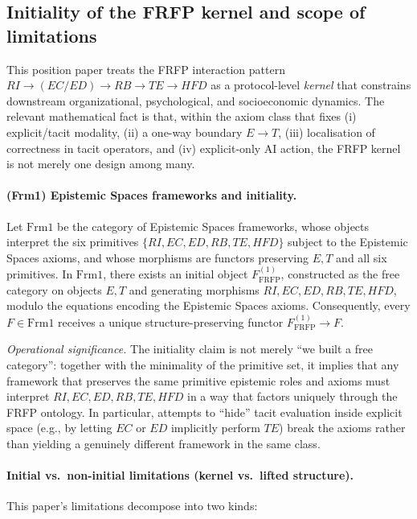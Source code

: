 \subsection{Initiality of the FRFP kernel and scope of limitations}
\label{sec:initiality-scope}

This position paper treats the FRFP interaction pattern
\(
RI \rightarrow (EC/ED) \rightarrow RB \rightarrow TE \rightarrow HFD
\)
as a protocol-level \emph{kernel} that constrains downstream organizational, psychological, and
socioeconomic dynamics. The relevant mathematical fact is that, within the axiom class that fixes
(i) explicit/tacit modality, (ii) a one-way boundary \(E \to T\), (iii) localisation of correctness in tacit
operators, and (iv) explicit-only AI action, the FRFP kernel is not merely one design among many.

\paragraph{(Frm1) Epistemic Spaces frameworks and initiality.}
Let \(\mathrm{Frm1}\) be the category of Epistemic Spaces frameworks, whose objects interpret the six
primitives \(\{RI,EC,ED,RB,TE,HFD\}\) subject to the Epistemic Spaces axioms, and whose morphisms
are functors preserving \(E,T\) and all six primitives. In \(\mathrm{Frm1}\), there exists an initial object
\(F^{(1)}_{\mathrm{FRFP}}\), constructed as the free category on objects \(E,T\) and generating morphisms
\(RI,EC,ED,RB,TE,HFD\), modulo the equations encoding the Epistemic Spaces axioms. Consequently,
every \(F \in \mathrm{Frm1}\) receives a unique structure-preserving functor
\(F^{(1)}_{\mathrm{FRFP}} \to F\). \cite{Nadendla2026FRFP}
\par
\noindent\emph{Operational significance.} The initiality claim is not merely “we built a free category”:
together with the minimality of the primitive set, it implies that any framework that preserves the
same primitive epistemic roles and axioms must interpret \(RI,EC,ED,RB,TE,HFD\) in a way that factors
uniquely through the FRFP ontology. In particular, attempts to “hide” tacit evaluation inside explicit
space (e.g., by letting \(EC\) or \(ED\) implicitly perform \(TE\)) break the axioms rather than yielding a
genuinely different framework in the same class. \cite{Nadendla2026FRFP}

\paragraph{Initial vs.\ non-initial limitations (kernel vs.\ lifted structure).}
This paper’s limitations decompose into two kinds:

